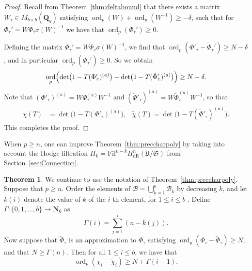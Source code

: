 \documentclass[a4paper,11pt]{article}
\numberwithin{equation}{section}
\newcommand{\NN}{\mathbf{N}} %
\newcommand{\QQ}{\mathbf{Q}} %
\DeclareMathOperator{\ord}{ord}          %
\providecommand{\HdR}{H_{\text{dR}}}    %
\providecommand{\cB}{\mathcal{B}} %
\theoremstyle{definition}
\newtheorem{thm}{Theorem}[section]
\newtheorem{rem}[thm]{Remark}
\begin{document}
\begin{proof} 
Recall from Theorem~\ref{thm:deltabound} that there exists a matrix $W_{\tau} \in M_{b \times b}(\QQ_q)$
satisfying $\ord_p(W)+\ord_p(W^{-1}) \geq -\delta$, such that for $\Phi_{\tau}'=W \Phi_{\tau} \sigma(W)^{-1}$ 
we have that \mbox{$\ord_p(\Phi_{\tau}') \geq 0$}.

Defining the matrix $\tilde{\Phi}_{\tau}'=W \tilde{\Phi}_{\tau} \sigma(W)^{-1}$,
we find that $\ord_p(\Phi'_{\tau}-\tilde{\Phi}_{\tau}') \geq N-\delta$, and in particular
$\ord_p(\tilde{\Phi}_{\tau}') \geq 0$. So we obtain
\[
\ord_p \Bigl( \det\bigl(1 - T (\Phi'_{\tau})^{(a)}\bigr) 
            - \det\bigl(1 - T (\tilde{\Phi}'_{\tau})^{(a)}\bigr) \Bigr) \geq N-\delta.
\] 
Note that $(\Phi'_{\tau})^{(a)}= W \Phi_{\tau}^{(a)} W^{-1}$
and $(\tilde{\Phi}'_{\tau})^{(a)}= W \tilde{\Phi}_{\tau}^{(a)} W^{-1}$, so that
\begin{align*}
\chi(T) &= \det\bigl(1 - T (\Phi'_{\tau})^{(a)}\bigr), \;\;\; 
\tilde{\chi}(T) = \det\bigl(1 - T (\tilde{\Phi}'_{\tau})^{(a)}\bigr).
\end{align*}
This completes the proof.
\end{proof}


When $p \geq n$, one can improve Theorem~\ref{thm:preccharpoly} by taking into account the Hodge
filtration $H_k=\mbox{Fil}^{n-k} \HdR^{n}(\mathfrak{U}/\mathfrak{S})$ from Section~\ref{sec:Connection}.

\begin{thm} \label{thm:pgeqn}
We continue to use the notation of Theorem~\ref{thm:preccharpoly}. Suppose that $p \geq n$. 
Order the elements of $\cB = \bigcup_{k=1}^n \cB_k$ by decreasing $k$, and let $k(i)$ 
denote the value of $k$ of the $i$-th element, for $1 \leq i \leq b$ . Define 
$\Gamma: \{0,1, \ldots, b\} \rightarrow \NN_0$ as
\[
\Gamma(i) = \sum_{j=1}^{i} (n-k(j)).
\]
Now suppose that $\tilde{\Phi}_{\tau}$ is an approximation to $\Phi_{\tau}$ satisfying
$\ord_p (\Phi_{\tau}-\tilde{\Phi}_{\tau}) \geq N$, and that $N \geq \Gamma(n)$. Then for all 
$1 \leq i \leq b$, we have that 
\[
\ord_p(\chi_i-\tilde{\chi}_i) \geq N + \Gamma(i-1).
\]
\end{thm}
 
\end{document}
